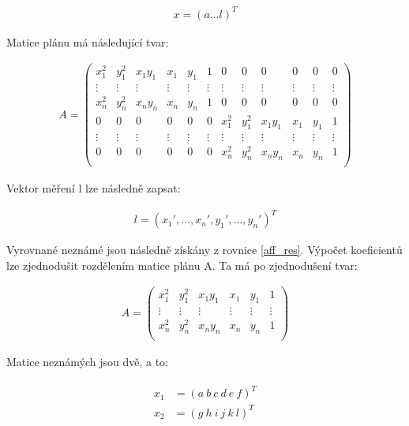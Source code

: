 \documentclass[thesis=M,czech]{FITthesis}[2012/06/26]
\begin{document}
\begin{align} \label{poly2_x}
x = (a \hdots l)^T
\end{align}

Matice plánu má následující tvar:

\setcounter{MaxMatrixCols}{20}
\begin{align} \label{poly_2_A}
A = \begin{pmatrix}
 x_1^2 & y_1^2 &  x_1y_1 & x_1 & y_1 & 1 & 0 & 0 & 0 & 0 & 0 & 0 \\ 
 \vdots & \vdots & \vdots & \vdots & \vdots & \vdots & \vdots & \vdots & \vdots & \vdots & \vdots & \vdots  \\
    x_n^2 & y_n^2 & x_ny_n & x_n & y_n & 1 & 0 & 0 & 0 & 0 & 0 & 0 \\
    0 & 0 & 0 & 0 & 0 & 0 & x_1^2 & y_1^2 & x_1y_1 & x_1 & y_1 & 1 \\
     \vdots & \vdots & \vdots & \vdots & \vdots & \vdots & \vdots & \vdots & \vdots & \vdots & \vdots & \vdots  \\
    0 & 0 & 0 & 0 & 0 & 0 & x_n^2 & y_n^2 & x_ny_n & x_n & y_n & 1 \\
\end{pmatrix}
\end{align}


Vektor měření l lze následně zapsat:

\begin{align} \label{poly2_l}
l = (x_1', \ldots , x_n', y_1', \ldots , y_n')^T
\end{align}

Vyrovnané neznámé jsou následně získány z rovnice \eqref{aff_res}. Výpočet koeficientů lze zjednodušit rozdělením matice plánu A. Ta má po zjednodušení tvar:

\begin{align} \label{poly2A_zjednodusena}
A = \begin{pmatrix}
 x_1^2 & y_1^2 &  x_1y_1 & x_1 & y_1 & 1  \\ 
 \vdots & \vdots & \vdots & \vdots & \vdots & \vdots   \\
    x_n^2 & y_n^2 & x_ny_n & x_n & y_n & 1  \\
\end{pmatrix}
\end{align}

Matice neznámých jsou dvě, a to:

\begin{align} \label{poly2_x12}
\begin{split}
x_1 &= (a\ b\ c\ d\ e\ f)^T  \\
x_2 &= (g\ h\ i\ j\ k\ l)^T
\end{split}
\end{align}
\end{document}
